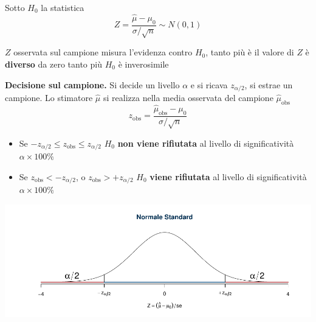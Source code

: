 \documentclass[
  11pt,
]{book}
\providecommand{\tightlist}{%
  \setlength{\itemsep}{0pt}\setlength{\parskip}{0pt}}
\theoremstyle{mytheoremstyle}
\theoremstyle{mydefstyle}
\begin{document}
Sotto \(H_0\) la statistica
\[Z=\frac{\hat\mu-\mu_0}{\sigma/\sqrt n}\sim N(0,1)\]

\(Z\) osservata sul campione misura l'evidenza contro \(H_0\), tanto più è
il valore di \(Z\) è \textbf{diverso} da zero tanto più \(H_0\) è inverosimile

\begin{info}

\textbf{Decisione sul campione.} Si decide un livello \(\alpha\) e si ricava
\(z_{\alpha/2}\), si estrae un campione. Lo stimatore \(\hat\mu\) si
realizza nella media osservata del campione \(\hat\mu_\text{obs}\)
\[z_{\text{obs}}=\frac{\hat\mu_\text{obs} -\mu_0}{\sigma/\sqrt n}\]

\begin{itemize}
\tightlist
\item
  Se \(-z_{\alpha/2}\leq z_{\text{obs}}\leq z_{\alpha/2}\) \(H_0\) \textbf{non
  viene rifiutata} al livello di significatività \(\alpha\times100\%\)
\item
  Se \(z_{\text{obs}}<-z_{\alpha/2}\), o \(z_{\text{obs}}>+z_{\alpha/2}\)
  \(H_0\) \textbf{viene rifiutata} al livello di significatività
  \(\alpha\times100\%\)
\end{itemize}

\begin{center}\includegraphics{Appunti_di_Statistica_2025_files/figure-latex/15-test-mu-pi-19-1} \end{center}

\end{info}
\end{document}

